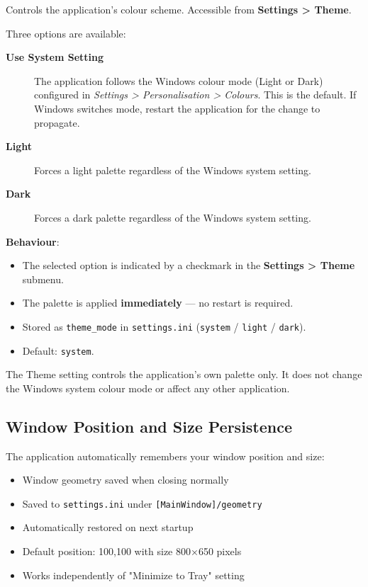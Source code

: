 \documentclass[a4paper,11pt]{article}
\begin{document}
Controls the application's colour scheme. Accessible from
\textbf{Settings > Theme}.

Three options are available:

\begin{description}
  \item[\textbf{Use System Setting}] The application follows the
    Windows colour mode (Light or Dark) configured in
    \textit{Settings > Personalisation > Colours}. This is the
    default. If Windows switches mode, restart the application for the
    change to propagate.
  \item[\textbf{Light}] Forces a light palette regardless of the
    Windows system setting.
  \item[\textbf{Dark}] Forces a dark palette regardless of the
    Windows system setting.
\end{description}

\textbf{Behaviour}:
\begin{itemize}
  \item The selected option is indicated by a checkmark in the
    \textbf{Settings > Theme} submenu.
  \item The palette is applied \textbf{immediately} --- no restart is
    required.
  \item Stored as \texttt{theme\_mode} in \texttt{settings.ini}
    (\texttt{system} / \texttt{light} / \texttt{dark}).
  \item Default: \texttt{system}.
\end{itemize}

\begin{infobox}[Note]
  The Theme setting controls the application's own palette only. It does
  not change the Windows system colour mode or affect any other
  application.
\end{infobox}

\subsection{Window Position and Size Persistence}

The application automatically remembers your window position and size:

\begin{itemize}
  \item Window geometry saved when closing normally
  \item Saved to \texttt{settings.ini} under \texttt{[MainWindow]/geometry}
  \item Automatically restored on next startup
  \item Default position: 100,100 with size 800×650 pixels
  \item Works independently of "Minimize to Tray" setting
\end{itemize}
\end{document}
